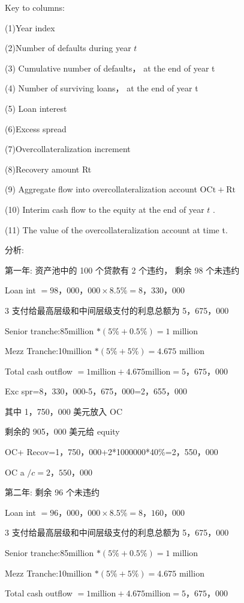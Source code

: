 Key to columns:

(1)Year index

(2)Number of defaults during year \(t\)

(3) Cumulative number of defaults， at the end of year t

(4) Number of surviving loans， at the end of year t

(5) Loan interest

(6)Excess spread

(7)Overcollateralization increment

(8)Recovery amount Rt

(9) Aggregate flow into overcollateralization account \(\mathrm{{OCt}} + \mathrm{{Rt}}\)

(10) Interim cash flow to the equity at the end of year \(t\) .

(11) The value of the overcollateralization account at time t.

 分析:

第一年: 资产池中的 100 个贷款有 2 个违约， 剩余 98 个未违约

Loan int \(= {98}，{000}，{000} \times  {8.5}\%  = 8，{330}，{000}\)

3 支付给最高层级和中间层级支付的利息总额为 5，675，000

Senior tranche:85million \(* \left( {5\%  + {0.5}\% }\right)  = 1\) million

Mezz Tranche:10million \(* \left( {5\%  + 5\% }\right)  = {4.675}\) million

Total cash outflow \(= 1\mathrm{{million}} + {4.675}\mathrm{{million}} = 5，{675}，{000}\)

Exc spr=8，330，000-5，675，000=2，655，000

其中 1，750，000 美元放入 OC

剩余的 905，000 美元给 equity

OC+ Recov=1，750，000+2*1000000*40\%=2，550，000

OC a \(/c = 2，{550}，{000}\)

第二年: 剩余 96 个未违约

Loan int \(= {96}，{000}，{000} \times  {8.5}\%  = 8，{160}，{000}\)

3 支付给最高层级和中间层级支付的利息总额为 5，675，000

Senior tranche:85million \(* \left( {5\%  + {0.5}\% }\right)  = 1\) million

Mezz Tranche:10million \(* \left( {5\%  + 5\% }\right)  = {4.675}\) million

Total cash outflow \(= 1\mathrm{{million}} + {4.675}\mathrm{{million}} = 5，{675}，{000}\)

